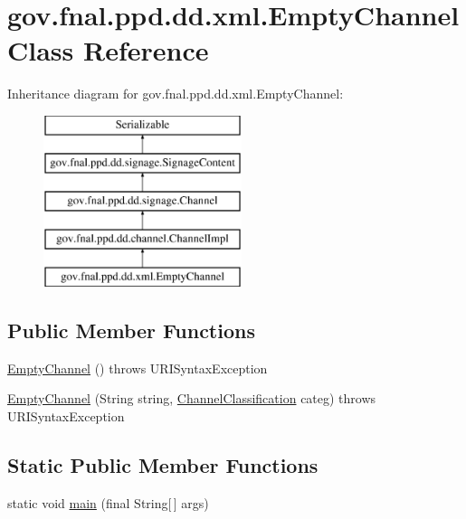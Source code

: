 \hypertarget{classgov_1_1fnal_1_1ppd_1_1dd_1_1xml_1_1EmptyChannel}{\section{gov.\-fnal.\-ppd.\-dd.\-xml.\-Empty\-Channel Class Reference}
\label{classgov_1_1fnal_1_1ppd_1_1dd_1_1xml_1_1EmptyChannel}
}
Inheritance diagram for gov.\-fnal.\-ppd.\-dd.\-xml.\-Empty\-Channel\-:\begin{figure}[H]
\begin{center}
\leavevmode
\includegraphics[height=5.000000cm]{classgov_1_1fnal_1_1ppd_1_1dd_1_1xml_1_1EmptyChannel}
\end{center}
\end{figure}
\subsection*{Public Member Functions}
\begin{DoxyCompactItemize}
\item 
\hyperlink{classgov_1_1fnal_1_1ppd_1_1dd_1_1xml_1_1EmptyChannel_aa5fef3cb69b155b97f5984de3407b927}{Empty\-Channel} ()  throws U\-R\-I\-Syntax\-Exception 
\item 
\hyperlink{classgov_1_1fnal_1_1ppd_1_1dd_1_1xml_1_1EmptyChannel_a0bb92f6a27ea9a2049b5f44b0a57b0ba}{Empty\-Channel} (String string, \hyperlink{classgov_1_1fnal_1_1ppd_1_1dd_1_1changer_1_1ChannelClassification}{Channel\-Classification} categ)  throws U\-R\-I\-Syntax\-Exception 
\end{DoxyCompactItemize}
\subsection*{Static Public Member Functions}
\begin{DoxyCompactItemize}
\item 
static void \hyperlink{classgov_1_1fnal_1_1ppd_1_1dd_1_1xml_1_1EmptyChannel_a149cbad6be33e6bf6e45608bffc2f95e}{main} (final String\mbox{[}$\,$\mbox{]} args)
\end{DoxyCompactItemize}
